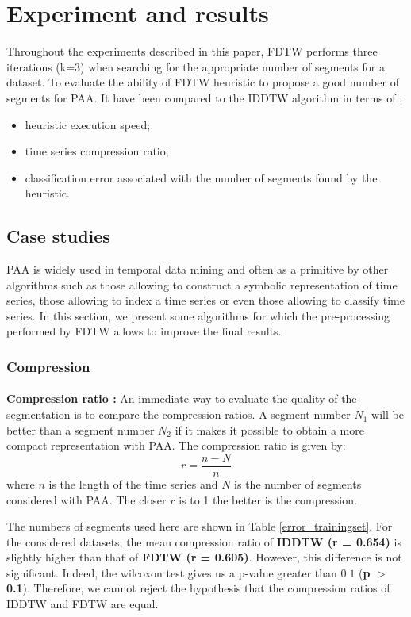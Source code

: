 \section{Experiment and results}
\label{sec:4}
Throughout the experiments described in this paper, FDTW performs three iterations (k=3) when searching for the appropriate number of segments for a dataset. To evaluate the ability of FDTW heuristic to propose a good number of segments for PAA. It have been compared to the IDDTW algorithm in terms of : 

\begin{itemize}
\item heuristic execution speed;
\item time series compression ratio;
\item classification error associated with the number of segments found by the heuristic.
\end{itemize}




\subsection{Case studies}

PAA is widely used in temporal data mining and often as a primitive by other algorithms such as
those allowing to construct a symbolic representation of time series, those allowing to index a
time series or even those allowing to classify time series. In this section, we present some
algorithms for which the pre-processing performed by FDTW allows to improve the final
results.
\subsubsection{Compression}

\paragraph{}\textbf{Compression ratio : }
An immediate way to evaluate the quality of the segmentation is to compare the compression ratios. A
segment number $N_1$ will be better than a segment number $N_2$ if it makes it possible to obtain a
more compact representation with PAA. The compression ratio is given by:
\[
r=\frac{n-N}{n}
\]
where $n$ is the length of the time series and $N$ is the number of segments considered with PAA. The closer $r$ is to 1 the better is the compression. 

The numbers of segments used here are shown in Table \ref{error_trainingset}. For the considered datasets, the mean compression ratio of \textbf{IDDTW (r = 0.654)}  is slightly higher than that
of \textbf{FDTW (r = 0.605)}. However, this difference is not significant. Indeed, the wilcoxon test
gives us a p-value greater than $0.1$ (\textbf{p} $>$ \textbf{0.1}). Therefore, we cannot reject the hypothesis that the
compression ratios of IDDTW and FDTW are equal.
\\

